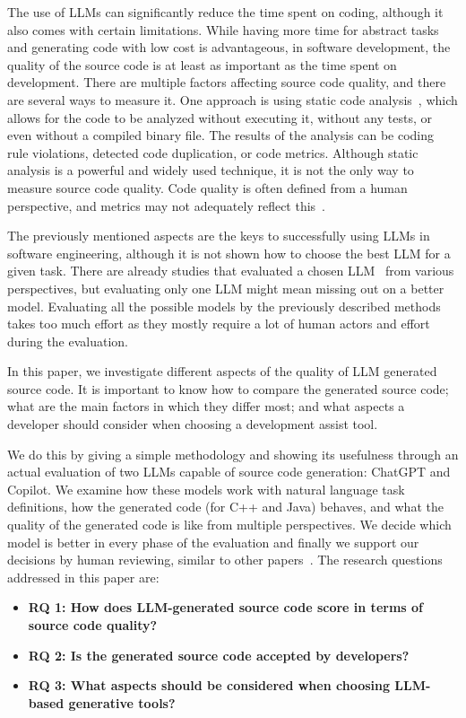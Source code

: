 The use of LLMs can significantly reduce the time spent on coding, although it also comes with certain limitations.
While having more time for abstract tasks and generating code with low cost is advantageous, in software development, the quality of the source code is at least as important as the time spent on development.
There are multiple factors affecting source code quality, and there are several ways to measure it.
One approach is using static code analysis~\cite{static_analysis_poc}, which allows for the code to be analyzed without executing it, without any tests, or even without a compiled binary file.
The results of the analysis can be coding rule violations, detected code duplication, or code metrics.
Although static analysis is a powerful and widely used technique, it is not the only way to measure source code quality.
Code quality is often defined from a human perspective, and metrics may not adequately reflect this~\cite{why_metrics_not_enough}.

The previously mentioned aspects are the keys to successfully using LLMs in software engineering, although it is not shown how to choose the best LLM for a given task.
There are already studies that evaluated a chosen LLM~\cite{codex, copilot_code_evaluation} from various perspectives, but evaluating only one LLM might mean missing out on a better model.
Evaluating all the possible models by the previously described methods takes too much effort as they mostly require a lot of human actors and effort during the evaluation.

In this paper, we investigate different aspects of the quality of LLM generated source code.
It is important to know how to compare the generated source code; what are the main factors in which they differ most; and what aspects a developer should consider when choosing a development assist tool.

We do this by giving a simple methodology and showing its usefulness through an actual evaluation of two LLMs capable of source code generation: ChatGPT and Copilot.
We examine how these models work with natural language task definitions, how the generated code (for C++ and Java) behaves, and what the quality of the generated code is like from multiple perspectives.
We decide which model is better in every phase of the evaluation and finally we support our decisions by human reviewing, similar to other papers~\cite{copilot_code_evaluation, copilot_code_evaluation_3}.
The research questions addressed in this paper are:
\begin{itemize}
	\item \textbf{RQ 1: How does LLM-generated source code score in terms of source code quality?}
	\item \textbf{RQ 2: Is the generated source code accepted by developers?}
	\item \textbf{RQ 3: What aspects should be considered when choosing LLM-based generative tools?}
\end{itemize}

